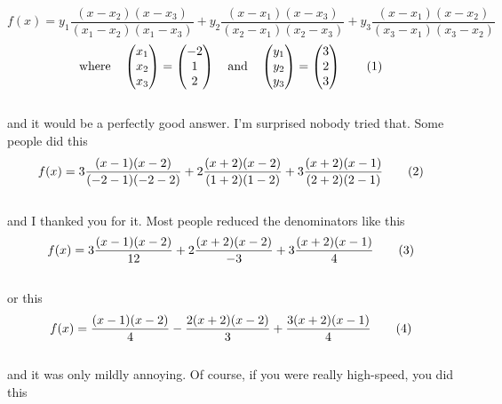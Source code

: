 \documentclass{article}
\newcommand\numberthis{\addtocounter{equation}{1}\tag{\theequation}}
\begin{document}
\[
f(x)  = y_1 \frac{(x - x_2)(x - x_3)}{(x_1 - x_2)(x_1 - x_3)} + y_2 \frac{(x - x_1)(x - x_3)}{(x_2 - x_1)(x_2 - x_3)} + y_3 \frac{(x - x_1)(x - x_2)}{(x_3 - x_1)(x_3 - x_2)} 
\]
\[
\text{where} \quad \begin{pmatrix} x_1 \\ x_2 \\ x_3 \end{pmatrix}  = \begin{pmatrix} -2 \\ 1 \\ 2 \end{pmatrix} \quad \text{and} \quad  \begin{pmatrix} y_1 \\ y_2 \\ y_3 \end{pmatrix}  = \begin{pmatrix} 3 \\ 2 \\ 3 \end{pmatrix} \numberthis
\] \\

{\setlength{\parindent}{0cm}
and it would be a perfectly good answer. I'm surprised nobody tried that. Some people did this}\\

\[
f(x)  = 3 \frac{(x - 1)(x - 2)}{(-2  - 1)(-2  - 2)} + 2 \frac{(x + 2)(x - 2)}{(1 + 2)(1 - 2)} + 3 \frac{(x + 2)(x - 1)}{(2 + 2)(2 - 1)} \numberthis \\
\] \\

{\setlength{\parindent}{0cm}
and I thanked you for it. Most people reduced the denominators like this} \\

\[
f(x)  = 3 \frac{(x - 1)(x - 2)}{12} + 2 \frac{(x + 2)(x - 2)}{-3} + 3 \frac{(x + 2)(x - 1)}{4} \numberthis \\
\] \\

{\setlength{\parindent}{0cm}
or this} \\

\[
f(x)  =  \frac{(x - 1)(x - 2)}{4} -  \frac{2(x + 2)(x - 2)}{3} + \frac{3(x + 2)(x - 1)}{4} \numberthis \\
\] \\

{\setlength{\parindent}{0cm}
and it was only mildly annoying. Of course, if you were really high-speed, you did this} \\
\end{document}

